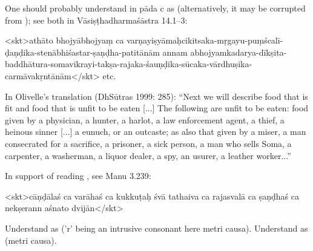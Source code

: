 { One should probably understand  in pāda c as  (alternatively,                 it may be corrupted from ); see both in Vāsiṣṭhadharmaśāstra 14.1--3:                 

                 <skt>athāto bhojyābhojyaṃ ca varṇayiṣyāmaḥ\danda                 cikitsaka-mṛgayu-puṃścalī-ḍaṇḍika-stenābhiśastar-ṣaṇḍha-patitānām annam abhojyam\danda                 kadarya-dīkṣita-baddhātura-somavikrayi-takṣa-rajaka-śauṇḍika-sūcaka-vārdhuṣika-carmāvakṛntānām\twodanda</skt> etc.                 

                 In Olivelle's translation (DhSūtras 1999: 285):                         ``Next we will describe food that is fit and food that is                         unfit to be eaten [...] The following are unfit                         to be eaten: food given by a physician, a hunter, a harlot, a law                         enforcement agent, a thief, a heinous sinner [...] a                         eunuch, or an outcaste; as also that given by a miser, a man                         consecrated for a sacrifice, a prisoner, a sick person, a man who                         sells Soma, a carpenter, a washerman, a liquor dealer, a spy, an                         usurer, a leather worker...''                 

                 In support of reading , see Manu 3.239:                 

                         <skt>cāṇḍālaś ca varāhaś ca kukkuṭaḥ śvā tathaiva ca\danda
                         rajasvalā ca ṣaṇḍhaś ca nekṣerann aśnato dvijān\twodanda</skt> }





{ Understand  as  ('r' being an intrusive consonant here metri causa).  Understand  as  (metri causa). }




